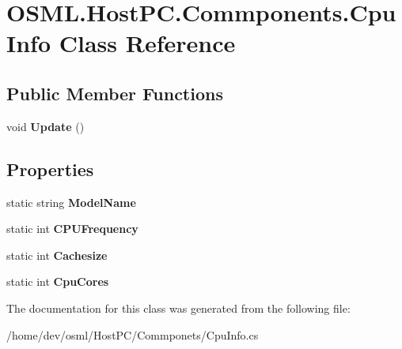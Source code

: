 \hypertarget{classOSML_1_1HostPC_1_1Commponents_1_1CpuInfo}{}\section{O\+S\+M\+L.\+Host\+P\+C.\+Commponents.\+Cpu\+Info Class Reference}
\label{classOSML_1_1HostPC_1_1Commponents_1_1CpuInfo}
\subsection*{Public Member Functions}
\begin{DoxyCompactItemize}
\item 
\mbox{\label{classOSML_1_1HostPC_1_1Commponents_1_1CpuInfo_a599043fb91266ec7692f4c968659eac3}} 
void {\bfseries Update} ()
\end{DoxyCompactItemize}
\subsection*{Properties}
\begin{DoxyCompactItemize}
\item 
\mbox{\label{classOSML_1_1HostPC_1_1Commponents_1_1CpuInfo_a7d467c7d1e1ca920fa5eb71edbb31bbb}} 
static string {\bfseries Model\+Name}
\item 
\mbox{\label{classOSML_1_1HostPC_1_1Commponents_1_1CpuInfo_a404ed7821272132dca71650d30609dfc}} 
static int {\bfseries C\+P\+U\+Frequency}
\item 
\mbox{\label{classOSML_1_1HostPC_1_1Commponents_1_1CpuInfo_a8a1b9b566e203b19524b85c06186a85b}} 
static int {\bfseries Cachesize}
\item 
\mbox{\label{classOSML_1_1HostPC_1_1Commponents_1_1CpuInfo_a216b506caf73b819f0e844b3af784fb9}} 
static int {\bfseries Cpu\+Cores}
\end{DoxyCompactItemize}


The documentation for this class was generated from the following file\+:\begin{DoxyCompactItemize}
\item 
/home/dev/osml/\+Host\+P\+C/\+Commponets/Cpu\+Info.\+cs\end{DoxyCompactItemize}

